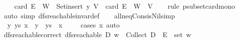 \begin{isabellebody}
\ \ \ {\isasymLongrightarrow}\ card\ {\isacharparenleft}{\kern0pt}E\isactrlsup {\isacharasterisk}{\kern0pt}\ {\isacharbackquote}{\kern0pt}{\isacharbackquote}{\kern0pt}\ W\ {\isacharminus}{\kern0pt}\ Set{\isachardot}{\kern0pt}insert\ y\ V{\isacharparenright}{\kern0pt}\ {\isacharless}{\kern0pt}\ card\ {\isacharparenleft}{\kern0pt}E\isactrlsup {\isacharasterisk}{\kern0pt}\ {\isacharbackquote}{\kern0pt}{\isacharbackquote}{\kern0pt}\ W\ {\isacharminus}{\kern0pt}\ V{\isacharparenright}{\kern0pt}{\isachardoublequoteclose}\isanewline
%
\isadelimproof
\ \ %
\endisadelimproof
%
\isatagproof
{}\isamarkupfalse%
\ {\isacharparenleft}{\kern0pt}rule\ psubset{\isacharunderscore}{\kern0pt}card{\isacharunderscore}{\kern0pt}mono{\isacharparenright}{\kern0pt}\isanewline
\ \ \isamarkupfalse%
\ {\isacharparenleft}{\kern0pt}auto\ simp{\isacharcolon}{\kern0pt}\ dfs{\isacharunderscore}{\kern0pt}reachable{\isacharunderscore}{\kern0pt}invar{\isacharunderscore}{\kern0pt}def{\isacharparenright}{\kern0pt}\isanewline
\ \ \isamarkupfalse%
%
\endisatagproof
{\isafoldproof}%
%
\isadelimproof
\isanewline
%
\endisadelimproof
\isanewline
{}\isamarkupfalse%
\ all{\isacharunderscore}{\kern0pt}neq{\isacharunderscore}{\kern0pt}Cons{\isacharunderscore}{\kern0pt}is{\isacharunderscore}{\kern0pt}Nil{\isacharbrackleft}{\kern0pt}simp{\isacharbrackright}{\kern0pt}{\isacharcolon}{\kern0pt}\ \isanewline
\ \ {\isachardoublequoteopen}{\isacharparenleft}{\kern0pt}{\isasymforall}y\ ys{\isachardot}{\kern0pt}\ x{}\ {\isasymnoteq}\ y\ {\isacharhash}{\kern0pt}\ ys{\isacharparenright}{\kern0pt}\ {\isasymlongleftrightarrow}\ x{}\ {\isacharequal}{\kern0pt}\ {\isacharbrackleft}{\kern0pt}{\isacharbrackright}{\kern0pt}{\isachardoublequoteclose}%
\isadelimproof
\ %
\endisadelimproof
%
\isatagproof
{}\isamarkupfalse%
\ {\isacharparenleft}{\kern0pt}cases\ x{}{\isacharparenright}{\kern0pt}\ auto%
\endisatagproof
{\isafoldproof}%
%
\isadelimproof
%
\endisadelimproof
\isanewline
\isanewline
{}\isamarkupfalse%
\ dfs{\isacharunderscore}{\kern0pt}reachable{\isacharunderscore}{\kern0pt}correct{\isacharcolon}{\kern0pt}\ {\isachardoublequoteopen}dfs{\isacharunderscore}{\kern0pt}reachable\ D\ w\ {\isasymlongleftrightarrow}\ Collect\ D\ {\isasyminter}\ E\isactrlsup {\isacharasterisk}{\kern0pt}\ {\isacharbackquote}{\kern0pt}{\isacharbackquote}{\kern0pt}\ set\ w\ {\isasymnoteq}\ {\isacharbraceleft}{\kern0pt}{\isacharbraceright}{\kern0pt}{\isachardoublequoteclose}\isanewline

\end{isabellebody}
